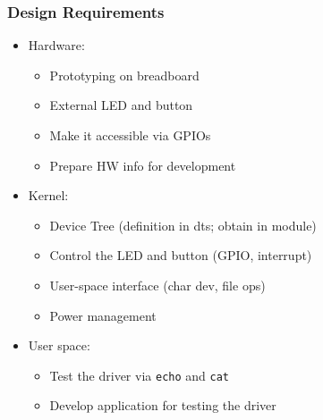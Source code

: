 \begin{frame}
  \frametitle{Design Requirements}
  \begin{itemize}

    \item Hardware:
    \begin{itemize}
      \item Prototyping on breadboard
      \item External LED and button
      \item Make it accessible via GPIOs
      \item Prepare HW info for development
    \end{itemize}

    \item Kernel:
    \begin{itemize}
      \item Device Tree (definition in dts; obtain in module)
      \item Control the LED and button (GPIO, interrupt)
      \item User-space interface (char dev, file ops)
      \item Power management
    \end{itemize}

    \item User space:
    \begin{itemize}
      \item Test the driver via \texttt{echo} and \texttt{cat}
      \item Develop application for testing the driver
    \end{itemize}
  \end{itemize}
\end{frame}


